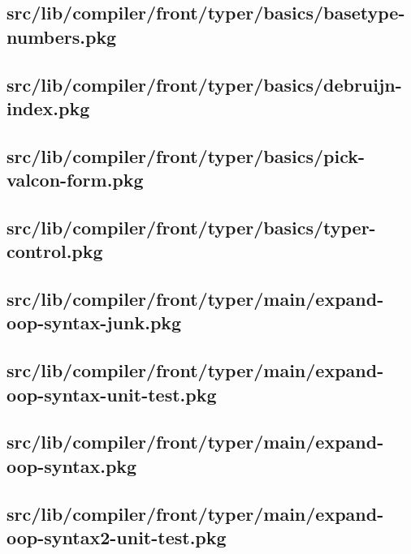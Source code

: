 \subsection{src/lib/compiler/front/typer/basics/basetype-numbers.pkg}


\subsection{src/lib/compiler/front/typer/basics/debruijn-index.pkg}


\subsection{src/lib/compiler/front/typer/basics/pick-valcon-form.pkg}


\subsection{src/lib/compiler/front/typer/basics/typer-control.pkg}


\subsection{src/lib/compiler/front/typer/main/expand-oop-syntax-junk.pkg}


\subsection{src/lib/compiler/front/typer/main/expand-oop-syntax-unit-test.pkg}


\subsection{src/lib/compiler/front/typer/main/expand-oop-syntax.pkg}


\subsection{src/lib/compiler/front/typer/main/expand-oop-syntax2-unit-test.pkg}


